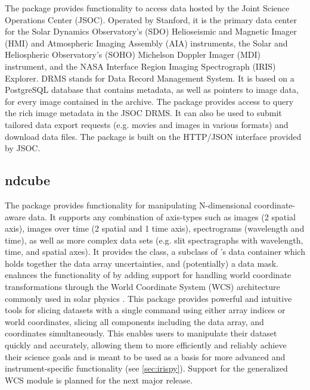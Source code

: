 The  package provides functionality to access data hosted by the Joint Science Operations Center (JSOC).
Operated by Stanford, it is the primary data center for the Solar Dynamics Observatory’s (SDO) Helioseismic and Magnetic Imager (HMI) and Atmospheric Imaging Assembly (AIA) instruments, the Solar and Heliospheric Observatory's (SOHO) Michelson Doppler Imager (MDI) instrument, and the NASA Interface Region Imaging Spectrograph (IRIS) Explorer.
DRMS stands for Data Record Management System. It is based on a PostgreSQL database that contains metadata, as well as pointers to image data, for every image contained in the archive.
The  package provides access to query the rich image metadata in the JSOC DRMS. It can also be used to submit tailored data export requests (e.g. movies and images in various formats) and download data files.
The package is built on the HTTP/JSON interface provided by JSOC.

\subsection{ndcube}
\label{sec:ndcube}

The  package provides functionality for manipulating N-dimensional coordinate-aware data.
It supports any combination of axis-types such as images (2 spatial axis), images over time (2 spatial and 1 time axis), spectrograms (wavelength and time), as well as more complex data sets (e.g. slit spectragraphs with wavelength, time, and spatial axes).
It provides the  class, a subclass of \astropy's  data container which holds together the data array uncertainties, and (potentially) a data mask.
 enahnces the functionality of  by adding support for handling world coordinate transformations through the World Coordinate System (WCS) architecture commonly used in solar physics \citep{2002A&A...395.1061G}.
This package provides powerful and intuitive tools for slicing datasets with a single command using either array indices or world coordinates, slicing all components including the data array, and coordinates simultaneously.
This enables users to manipulate their dataset quickly and accurately, allowing them to more efficiently and reliably achieve their science goals and is meant to be used as a basis for more advanced and instrument-specific functionality (see \autoref{sec:irispy}).
Support for the generalized WCS module \citep{gwcs2018} is planned for the next major release.

